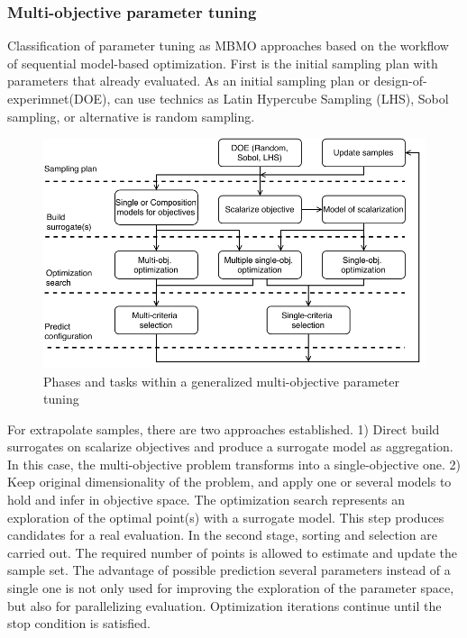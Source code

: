         \subsubsection{Multi-objective parameter tuning}

            Classification of parameter tuning as MBMO approaches based on the workflow of sequential model-based optimization. First is the initial sampling plan with parameters that already evaluated. As an initial sampling plan or design-of-experimnet(DOE), can use technics as Latin Hypercube Sampling (LHS), Sobol sampling, or alternative is random sampling.
            
            \begin{figure} 
                \centering
                \includegraphics[width=\textwidth]{content/images/tax_mb_tuning}
                \caption[Phases and tasks within a generalized multi-objective parameter tuning]{Phases and tasks within a generalized multi-objective parameter tuning}
                \label{fig:mo_param_tuning}
            \end{figure}

            For extrapolate samples, there are two approaches established. 1) Direct build surrogates on scalarize objectives and produce a surrogate model as aggregation. In this case, the multi-objective problem transforms into a single-objective one. 2) Keep original dimensionality of the problem, and apply one or several models to hold and infer in objective space.
            The optimization search represents an exploration of the optimal point(s) with a surrogate model. This step produces candidates for a real evaluation. In the second stage, sorting and selection are carried out. The required number of points is allowed to estimate and update the sample set. The advantage of possible prediction several parameters instead of a single one is not only used for improving the exploration of the parameter space, but also for parallelizing evaluation.  Optimization iterations continue until the stop condition is satisfied.
    
